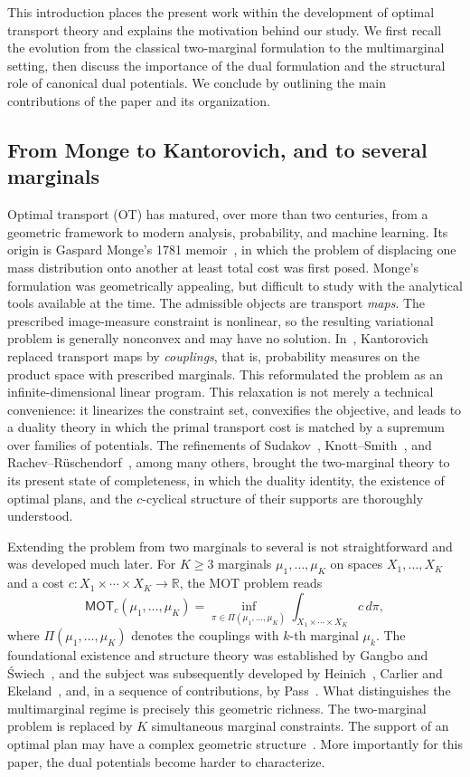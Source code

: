 \documentclass[twoside,11pt,a4paper]{article}
\begin{document}
This introduction places the present work within the development of optimal transport theory and explains the motivation behind our study. We first recall the evolution from the classical two-marginal formulation to the multimarginal setting, then discuss the importance of the dual formulation and the structural role of canonical dual potentials. We conclude by outlining the main contributions of the paper and its organization.

\subsection{From Monge to Kantorovich, and to several marginals}

Optimal transport (OT) has matured, over more than two centuries, from a
geometric framework to modern analysis,
probability, and machine learning. Its origin is Gaspard Monge's 1781
memoir~\cite{monge1781memoire}, in which the problem of displacing one mass
distribution onto another at least total cost was first posed. Monge's formulation was geometrically appealing, but difficult to study with the analytical tools available at the time. The admissible objects are transport \emph{maps}. The prescribed image-measure constraint is nonlinear, so the resulting variational problem is generally nonconvex and may have no solution.
In~\cite{article}, Kantorovich replaced transport maps by \emph{couplings}, that is, probability measures on the product space with prescribed marginals. This reformulated the problem as an infinite-dimensional linear program. This relaxation is not merely a technical convenience: it
linearizes the constraint set, convexifies the objective, and leads to a duality theory in which the primal transport cost is matched by a supremum over families of potentials. The
refinements of Sudakov~\cite{Sudakov1979}, Knott--Smith~\cite{knott1984}, and
Rachev--Rüschendorf~\cite{rachev1998}, among many others, brought the
two-marginal theory to its present state of completeness, in which the duality
identity, the existence of optimal plans, and the $c$-cyclical structure of their
supports are thoroughly understood.

Extending the problem from two marginals to several is not straightforward and was developed much later. For $K\ge3$ marginals
$\mu_1,\dots,\mu_K$ on spaces $X_1,\dots,X_K$ and a cost
$c:X_1\times\cdots\times X_K\to\mathbb R$, the MOT problem reads
\[
\mathsf{MOT}_c(\mu_1,\dots,\mu_K)
=\inf_{\pi\in\Pi(\mu_1,\dots,\mu_K)}
\int_{X_1\times\cdots\times X_K} c\,d\pi,
\]
where $\Pi(\mu_1,\dots,\mu_K)$ denotes the couplings with $k$-th marginal $\mu_k$.
The foundational existence and structure theory was established by Gangbo and
\'Swiech~\cite{gangbo1998}, and the subject was subsequently developed by
Heinich~\cite{heinich2002}, Carlier and Ekeland~\cite{carlier2010}, and, in a
sequence of contributions, by Pass~\cite{pass2012,pass2015}. What
distinguishes the multimarginal regime is precisely this geometric richness. The two-marginal problem is replaced by $K$ simultaneous marginal constraints. The support of an optimal plan may have a complex geometric structure~\cite{colombo2015}. More importantly for this paper, the dual potentials become harder to characterize.
\end{document}
